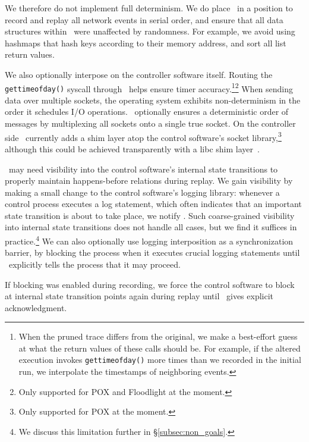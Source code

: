 We therefore do not implement full determinism. We do place \projectname~in a position to
record and replay all network events in serial order, and ensure that all
data structures within \projectname~were unaffected by randomness. For example,
we avoid using hashmaps that hash keys according to their memory address,
and sort all list return values.

We also optionally interpose on the controller software itself.
Routing the {\tt gettimeofday()} syscall through \projectname~helps ensure timer
accuracy.\footnote{When the pruned trace differs from the original, we make a
best-effort guess at what the return values of these calls should be. For example,
if the altered execution invokes {\tt gettimeofday()} more times than we recorded
in the initial run, we interpolate the timestamps of neighboring events.}\footnote{Only
supported for POX and Floodlight at the moment.\label{fn:pox_fl}} When sending data over multiple sockets, the operating system exhibits
non-determinism in the order it schedules I/O operations.
\projectname~optionally ensures a deterministic order of messages
by multiplexing all sockets
onto a single true socket. On the controller side \projectname~currently
adds a shim layer atop the control
software's socket library,\footnote{Only supported for POX at the moment.} although this
could be achieved transparently with a libc shim layer~\cite{Geels:2006:RDD:1267359.1267386}.

\projectname~may need visibility into the control software's internal state
transitions to properly maintain happens-before relations during replay. We
gain visibility by making a
small change to the control software's logging library: whenever a control process executes a log
statement, which often indicates that an important state transition is about to take
place, we notify \projectname. Such coarse-grained visibility into internal
state transitions does not handle all cases, but we find it suffices in practice.\footnote{We discuss this limitation further in \S\ref{subsec:non_goals}.}
We can also optionally use
logging interposition as a
synchronization barrier, by blocking the process when it executes crucial logging statements
until \projectname~explicitly tells the process that it may proceed.

If blocking was enabled
during recording, we force the control software to block at internal state
transition points again during replay
until \projectname~gives explicit acknowledgment.


